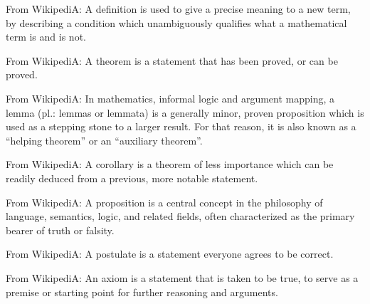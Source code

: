 \begin{definition}\leavevmode\newline
    From WikipediA: A definition is used to give a precise meaning to a new term, by describing a condition which unambiguously qualifies what a mathematical term is and is not.
\end{definition}

\begin{theorem}\leavevmode\newline
    From WikipediA: A theorem is a statement that has been proved, or can be proved.
\end{theorem}

\begin{lemma}\leavevmode\newline
    From WikipediA: In mathematics, informal logic and argument mapping, a lemma (pl.: lemmas or lemmata) is a generally minor, proven proposition which is used as a stepping stone to a larger result. For that reason, it is also known as a ``helping theorem'' or an ``auxiliary theorem''.
\end{lemma}

\begin{corollary}\leavevmode\newline
    From WikipediA: A corollary is a theorem of less importance which can be readily deduced from a previous, more notable statement.
\end{corollary}

\begin{proposition}\leavevmode\newline
    From WikipediA: A proposition is a central concept in the philosophy of language, semantics, logic, and related fields, often characterized as the primary bearer of truth or falsity.
\end{proposition}

\begin{postulate}\leavevmode\newline
    From WikipediA: A postulate is a statement everyone agrees to be correct.
\end{postulate}

\begin{axiom}\leavevmode\newline
    From WikipediA: An axiom is a statement that is taken to be true, to serve as a premise or starting point for further reasoning and arguments.
\end{axiom}

